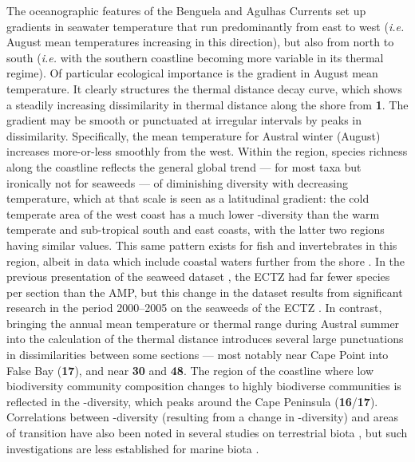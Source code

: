 \documentclass[utf8]{frontiersSCNS} %
\begin{document}
The oceanographic features of the Benguela and Agulhas Currents set up gradients in seawater temperature that run predominantly from east to west (\emph{i.e.} August mean temperatures increasing in this direction), but also from north to south (\emph{i.e.} with the southern coastline becoming more variable in its thermal regime). Of particular ecological importance is the gradient in August mean temperature. It clearly structures the thermal distance decay curve, which shows a steadily increasing dissimilarity in thermal distance along the shore from \textbf{1}. The gradient may be smooth or punctuated at irregular intervals by peaks in dissimilarity. Specifically, the mean temperature for Austral winter (August) increases more-or-less smoothly from the west. Within the region, species richness along the coastline reflects the general global trend --- for most taxa but ironically not for seaweeds \citep{Bolton1994,Santelices2009chapter} --- of diminishing diversity with decreasing temperature, which at that scale is seen as a latitudinal gradient: the cold temperate area of the west coast has a much lower \textalpha-diversity than the warm temperate and sub-tropical south and east coasts, with the latter two regions having similar values. This same pattern exists for fish and invertebrates in this region, albeit in data which include coastal waters further from the shore \citep{Griffiths2010}. In the previous presentation of the seaweed dataset \citep{Bolton2002}, the ECTZ had far fewer species per section than the AMP, but this change in the dataset results from significant research in the period 2000--2005 on the seaweeds of the ECTZ \citep{DeClerck2005}. In contrast, bringing the annual mean temperature or thermal range during Austral summer into the calculation of the thermal distance introduces several large punctuations in dissimilarities between some sections --- most notably near Cape Point into False Bay (\textbf{17}), and near \textbf{30} and \textbf{48}. The region of the coastline where low biodiversity community composition changes to highly biodiverse communities is reflected in the \textbeta-diversity, which peaks around the Cape Peninsula (\textbf{16}/\textbf{17}). Correlations between \textbeta-diversity (resulting from a change in \textalpha-diversity) and areas of transition have also been noted in several studies on terrestrial biota \citep{Melo2009,Tonial2012}, but such investigations are less established for marine biota \citep{Schils2006,Anderson2013}.
\end{document}
